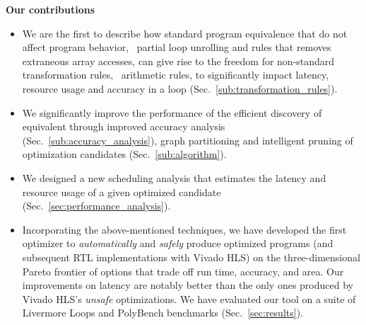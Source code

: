 \begin{trivlist}\item{\bf Our contributions}

\begin{itemize}

    \item We are the first to describe how standard program equivalence
    that do not affect program behavior, \eg~partial loop unrolling and
    rules that removes extraneous array accesses, can give rise to the
    freedom for non-standard transformation rules, \eg~arithmetic rules,
    to significantly impact latency, resource usage and accuracy in a loop
    (Sec.~\ref{sub:transformation_rules}).

    \item We significantly improve the performance of the efficient
    discovery of equivalent through improved accuracy analysis
    (Sec.~\ref{sub:accuracy_analysis}), graph partitioning and intelligent
    pruning of optimization candidates (Sec.~\ref{sub:algorithm}).

    \item We designed a new scheduling analysis that estimates
    the latency and resource usage of a given optimized candidate
    (Sec.~\ref{sec:performance_analysis}).

    \item Incorporating the above-mentioned techniques, we have developed
    the first optimizer to \emph{automatically} and \emph{safely} produce
    optimized programs (and subsequent RTL implementations with Vivado HLS) on
    the three-dimensional Pareto frontier of options that trade off run time,
    accuracy, and area.  Our improvements on latency are notably better than
    the only ones produced by Vivado HLS's \emph{unsafe} optimizations. We have
    evaluated our tool on a suite of Livermore Loops and PolyBench benchmarks
    (Sec.~\ref{sec:results}).

\end{itemize}

\end{trivlist}
